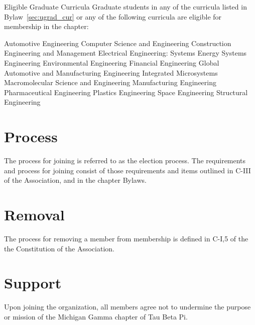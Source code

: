 \begin{enumsubsection}
\begin{enumsubsubsection}
\pagebreak
 \end{enumsubsubsection}
\let\labelenumii\oldenumi
\item{Eligible Graduate Curricula}
Graduate students in any of the curricula listed in Bylaw~\ref{sec:ugrad_cur} or any of the following curricula are eligible for membership in the chapter:
\let\oldenumi\labelenumii
\renewcommand{\labelenumii}{\arabic{enumii}.}
\begin{enumsubsubsection}
\itemnotoc Automotive Engineering
\itemnotoc Computer Science and Engineering
\itemnotoc Construction Engineering and Management
\itemnotoc Electrical Engineering: Systems
\itemnotoc Energy Systems Engineering
\itemnotoc Environmental Engineering
\itemnotoc Financial Engineering
\itemnotoc Global Automotive and Manufacturing Engineering
\itemnotoc Integrated Microsystems
\itemnotoc Macromolecular Science and Engineering
\itemnotoc Manufacturing Engineering
\itemnotoc Pharmaceutical Engineering
\itemnotoc Plastics Engineering
\itemnotoc Space Engineering
\itemnotoc Structural Engineering
\end{enumsubsubsection}
\let\labelenumii\oldenumi
\end{enumsubsection}

\section{Process}
The process for joining is referred to as the election process.
The requirements and process for joining consist of those requirements and items outlined in C-III of the Association, and in the chapter Bylaws.

\section{Removal}
The process for removing a member from membership is defined in C-I,5 of the the Constitution of the Association.

\section{Support}
Upon joining the organization, all members agree not to undermine the purpose or mission of the Michigan Gamma chapter of Tau Beta Pi.
